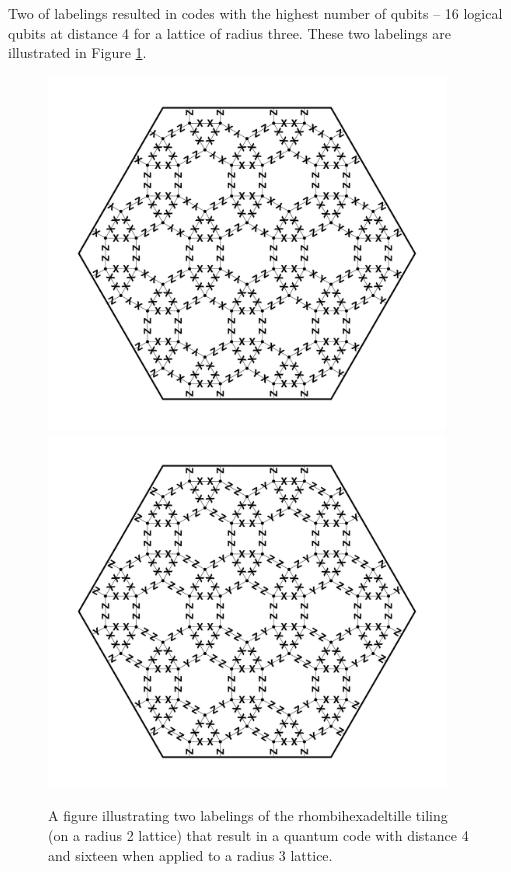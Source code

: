 \documentclass[12pt]{amsbook}
\theoremstyle{plain}
\theoremstyle{definition}
\theoremstyle{remark}
\begin{document}
Two of labelings resulted in codes with the highest number of qubits -- 16 logical qubits at distance 4 for a lattice of radius three.  These two labelings are illustrated in Figure \ref{figure:rhombihexadeltille-code-4-labelings}.



\begin{figure}
\includegraphics[width=4.15in]{images/rhombihexadeltille-code-4-labeling-1} %
\\
\includegraphics[width=4.15in]{images/rhombihexadeltille-code-4-labeling-2} %
\caption{
\label{figure:rhombihexadeltille-code-4-labelings}
A figure illustrating two labelings of the rhombihexadeltille tiling (on a radius 2 lattice) that result in a quantum code with distance 4 and sixteen when applied to a radius 3 lattice.
}
\end{figure}
\end{document}
